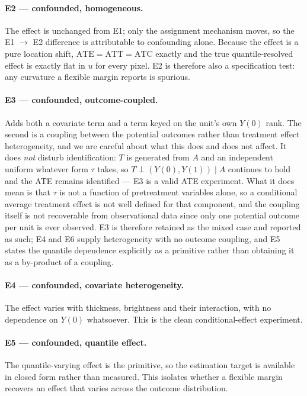 \paragraph{E2 --- confounded, homogeneous.} The effect is unchanged from E1; only the
assignment mechanism moves, so the E1 $\to$ E2 difference is attributable to confounding
alone. Because the effect is a pure location shift, $\mathrm{ATE} = \mathrm{ATT} =
\mathrm{ATC}$ exactly and the true quantile-resolved effect is exactly flat in $u$ for every
pixel. E2 is therefore also a specification test: any curvature a flexible margin reports is
spurious.

\paragraph{E3 --- confounded, outcome-coupled.} Adds both a covariate term and a term keyed on
the unit's own $Y(0)$ rank. The second is a coupling between the potential outcomes rather
than treatment effect heterogeneity, and we are careful about what this does and does not
affect. It does \emph{not} disturb identification: $T$ is generated from $A$ and an independent
uniform whatever form $\tau$ takes, so $T \perp (Y(0), Y(1)) \mid A$ continues to hold and the
ATE remains identified --- E3 is a valid ATE experiment. What it does mean is that $\tau$ is
not a function of pretreatment variables alone, so a conditional average treatment effect is
not well defined for that component, and the coupling itself is not recoverable from
observational data since only one potential outcome per unit is ever observed. E3 is therefore
retained as the mixed case and reported as such; E4 and E6 supply heterogeneity with no
outcome coupling, and E5 states the quantile dependence explicitly as a primitive rather than
obtaining it as a by-product of a coupling.

\paragraph{E4 --- confounded, covariate heterogeneity.} The effect varies with thickness,
brightness and their interaction, with no dependence on $Y(0)$ whatsoever. This is the clean
conditional-effect experiment.

\paragraph{E5 --- confounded, quantile effect.} The quantile-varying effect is the primitive,
so the estimation target is available in closed form rather than measured. This isolates
whether a flexible margin recovers an effect that varies across the outcome distribution.

